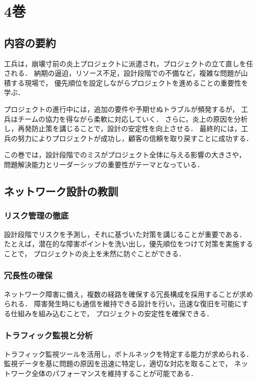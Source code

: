 \documentclass[titlepage,a4paper]{jsarticle}
\begin{document}
\section{4巻}
\subsection{内容の要約}
工兵は，崩壊寸前の炎上プロジェクトに派遣され，プロジェクトの立て直しを任される．
納期の逼迫，リソース不足，設計段階での不備など，複雑な問題が山積する現場で，
優先順位を設定しながらプロジェクトを進めることの重要性を学ぶ．

プロジェクトの進行中には，追加の要件や予期せぬトラブルが頻発するが，
工兵はチームの協力を得ながら柔軟に対応していく．
さらに，炎上の原因を分析し，再発防止策を講じることで，設計の安定性を向上させる．
最終的には，工兵の努力によりプロジェクトが成功し，顧客の信頼を取り戻すことに成功する．

この巻では，設計段階でのミスがプロジェクト全体に与える影響の大きさや，
問題解決能力とリーダーシップの重要性がテーマとなっている．

\subsection{ネットワーク設計の教訓}
\subsubsection{リスク管理の徹底}
設計段階でリスクを予測し，それに基づいた対策を講じることが重要である．
たとえば，潜在的な障害ポイントを洗い出し，優先順位をつけて対策を実施することで，
プロジェクトの炎上を未然に防ぐことができる．

\subsubsection{冗長性の確保}
ネットワーク障害に備え，複数の経路を確保する冗長構成を採用することが求められる．
障害発生時にも通信を維持できる設計を行い，迅速な復旧を可能にする仕組みを組み込むことで，
プロジェクトの安定性を確保できる．

\subsubsection{トラフィック監視と分析}
トラフィック監視ツールを活用し，ボトルネックを特定する能力が求められる．
監視データを基に問題の原因を迅速に特定し，適切な対応を取ることで，
ネットワーク全体のパフォーマンスを維持することが可能である．
\end{document}
